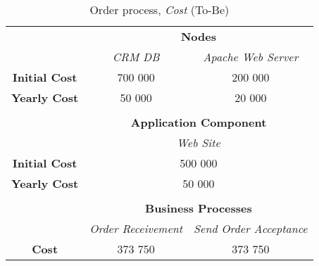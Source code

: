 \begin{table}[H]
	\centering
	\begin{tabular}{|c|c|p{2cm}|p{2.5cm}|p{2.5cm}|p{2.5cm}|}
		\cline{3-6}

		\multicolumn{2}{c}{} & \multicolumn{4}{|c|}{\textbf{Nodes}} \\ \cline{3-6}
		\multicolumn{2}{c|}{} & \multicolumn{2}{c|}{\textsl{CRM DB}} & \multicolumn{2}{c|}{\textsl{Apache Web Server}} \\
		\hline
		\multicolumn{2}{|c|}{\textbf{Initial Cost}} & \multicolumn{2}{c|}{700 000} & \multicolumn{2}{c|}{200 000} \\ \hline
		\multicolumn{2}{|c|}{\textbf{Yearly Cost}}  & \multicolumn{2}{c|}{50 000} & \multicolumn{2}{c|}{20 000} \\ \hline
		
		\multicolumn{6}{c}{} \\ \cline{3-6}
		\multicolumn{2}{c}{} & \multicolumn{4}{|c|}{\textbf{Application Component}} \\ \cline{3-6}
		\multicolumn{2}{c|}{} & \multicolumn{4}{c|}{\textsl{Web Site}} \\
		\hline
		\multicolumn{2}{|c|}{\textbf{Initial Cost}} & \multicolumn{4}{c|}{500 000}  \\ \hline
		\multicolumn{2}{|c|}{\textbf{Yearly Cost}}  & \multicolumn{4}{c|}{50 000}  \\ \hline

		\multicolumn{6}{c}{} \\ \cline{3-6}
		\multicolumn{2}{c}{} & \multicolumn{4}{|c|}{\textbf{Business Processes}} \\ \cline{3-6}
		\multicolumn{2}{c|}{} & \multicolumn{2}{c|}{\textsl{Order Receivement}} & \multicolumn{2}{c|}{\textsl{Send Order Acceptance}} \\
		\hline
		\multicolumn{2}{|c|}{\textbf{Cost}} & \multicolumn{2}{c|}{373 750} & \multicolumn{2}{c|}{373 750} \\ \hline
	\end{tabular}
\caption{Order process, \textsl{Cost} (To-Be)} 
\label{tab:order_to_be}
\end{table}